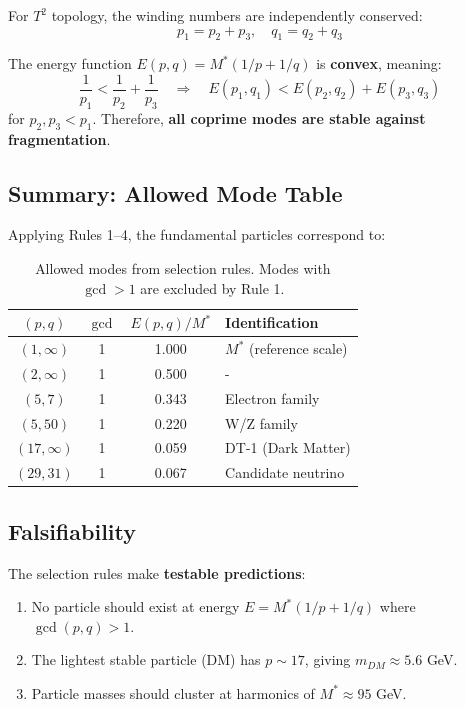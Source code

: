 For $T^2$ topology, the winding numbers are independently conserved:
\begin{equation}
    p_1 = p_2 + p_3, \quad q_1 = q_2 + q_3
\end{equation}

The energy function $E(p,q) = M^*(1/p + 1/q)$ is \textbf{convex}, meaning:
\begin{equation}
    \frac{1}{p_1} < \frac{1}{p_2} + \frac{1}{p_3} \quad \Rightarrow \quad E(p_1, q_1) < E(p_2, q_2) + E(p_3, q_3)
\end{equation}
for $p_2, p_3 < p_1$. Therefore, \textbf{all coprime modes are stable against fragmentation}.

\subsection{Summary: Allowed Mode Table}

Applying Rules 1–4, the fundamental particles correspond to:

\begin{table}[H]
\centering
\begin{tabular}{cccl}
\toprule
$(p,q)$ & $\gcd$ & $E(p,q)/M^*$ & Identification \\
\midrule
$(1,\infty)$ & 1 & 1.000 & $M^*$ (reference scale) \\
$(2,\infty)$ & 1 & 0.500 & - \\
$(5,7)$ & 1 & 0.343 & Electron family \\
$(5,50)$ & 1 & 0.220 & W/Z family \\
$(17,\infty)$ & 1 & 0.059 & DT-1 (Dark Matter) \\
$(29,31)$ & 1 & 0.067 & Candidate neutrino \\
\bottomrule
\end{tabular}
\caption{Allowed modes from selection rules. Modes with $\gcd > 1$ are excluded by Rule 1.}
\end{table}

\subsection{Falsifiability}

The selection rules make \textbf{testable predictions}:
\begin{enumerate}
    \item No particle should exist at energy $E = M^*(1/p + 1/q)$ where $\gcd(p,q) > 1$.
    \item The lightest stable particle (DM) has $p \sim 17$, giving $m_{DM} \approx 5.6$ GeV.
    \item Particle masses should cluster at harmonics of $M^* \approx 95$ GeV.
\end{enumerate}

